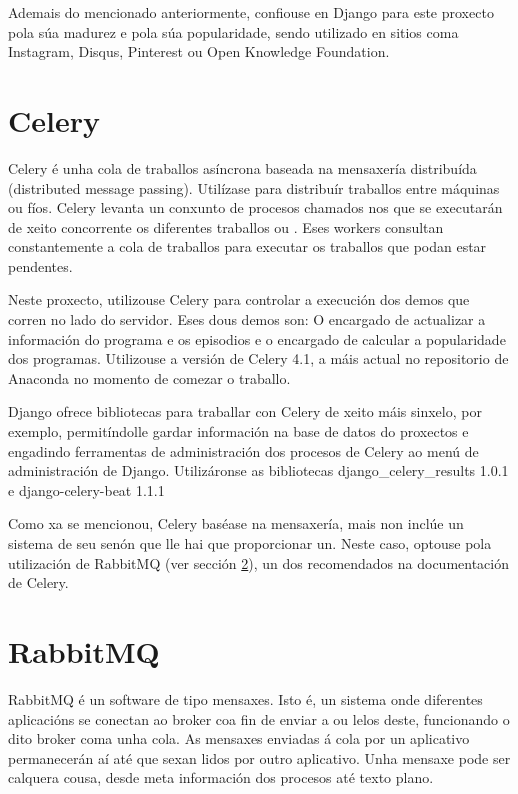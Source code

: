 Ademais do mencionado anteriormente, confiouse en Django para este proxecto pola súa madurez e pola súa popularidade, sendo  utilizado en sitios coma Instagram, Disqus, Pinterest ou Open Knowledge Foundation.


\section{Celery}

Celery é unha cola de traballos asíncrona baseada na mensaxería distribuída (distributed message passing). Utilízase para distribuír traballos entre máquinas ou fíos. Celery levanta un conxunto de procesos chamados  nos que se executarán de xeito concorrente os diferentes traballos ou . Eses workers consultan constantemente a cola de traballos para executar os traballos que podan estar pendentes\cite{celery}.

Neste proxecto, utilizouse Celery para controlar a execución dos demos que corren no lado do servidor. Eses dous demos son: O encargado de actualizar a información do programa e os episodios e o encargado de calcular a popularidade dos programas. Utilizouse a versión de Celery 4.1, a máis actual no repositorio de Anaconda no momento de comezar o traballo.

Django ofrece bibliotecas para traballar con Celery de xeito máis sinxelo, por exemplo, permitíndolle gardar información na base de datos do proxectos e engadindo ferramentas de administración dos procesos de Celery ao menú de administración de Django. Utilizáronse as bibliotecas django\_celery\_results 1.0.1 e django-celery-beat 1.1.1

Como xa se mencionou, Celery baséase na mensaxería, mais non inclúe un sistema de seu senón que lle hai que proporcionar un. Neste caso, optouse pola utilización de RabbitMQ (ver sección \ref{rabbit}), un dos recomendados na documentación de Celery.

\section{RabbitMQ}
\label{rabbit}

RabbitMQ é un software de  tipo  mensaxes. Isto é, un sistema onde diferentes aplicacións se conectan ao broker coa fin de enviar a ou lelos deste, funcionando o dito broker coma unha cola. As mensaxes enviadas á cola por un aplicativo permanecerán aí até que sexan lidos por outro aplicativo. Unha mensaxe pode ser calquera cousa, desde meta información dos procesos até texto plano\cite{rabbitmq}.

